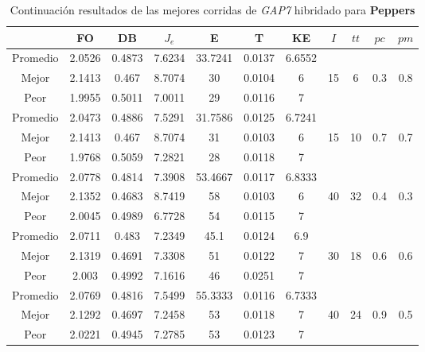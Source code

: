 \begin{table}[h!]
    \footnotesize
    \begin{center}
        \begin{tabular}{|c|c|c|c|c|c|c|c|c|c|c|}
        \hline
             & {\bf FO} & {\bf DB} & $J_e$ & {\bf E} & {\bf T} & {\bf KE} & $I$ & $tt$ & $pc$ & $pm$ \\
        \hline
        \hline
            Promedio  & 2.0526 & 0.4873 & 7.6234 & 33.7241 & 0.0137 & 6.6552 &  &  &  & \\
            \cline{1-7}
            Mejor & 2.1413 & 0.467  & 8.7074 & 30 & 0.0104 & 6 & 15 & 6 & 0.3 & 0.8\\
            \cline{1-7}
            Peor & 1.9955 & 0.5011  & 7.0011 & 29 & 0.0116 & 7 &  &  &  & \\
        \hline
        \hline
            Promedio  & 2.0473 & 0.4886 & 7.5291 & 31.7586 & 0.0125 & 6.7241 &  &  &  & \\
            \cline{1-7}
            Mejor & 2.1413 & 0.467  & 8.7074 & 31 & 0.0103 & 6 & 15 & 10 & 0.7 & 0.7\\
            \cline{1-7}
            Peor & 1.9768 & 0.5059  & 7.2821 & 28 & 0.0118 & 7 &  &  &  & \\
        \hline
        \hline
            Promedio  & 2.0778 & 0.4814 & 7.3908 & 53.4667 & 0.0117 & 6.8333 &  &  &  & \\
            \cline{1-7}
            Mejor & 2.1352 & 0.4683  & 8.7419 & 58 & 0.0103 & 6 & 40 & 32 & 0.4 & 0.3\\
            \cline{1-7}
            Peor & 2.0045 & 0.4989  & 6.7728 & 54 & 0.0115 & 7 &  &  &  & \\
        \hline
        \hline
            Promedio  & 2.0711 & 0.483 & 7.2349 & 45.1 & 0.0124 & 6.9 &  &  &  & \\
            \cline{1-7}
            Mejor & 2.1319 & 0.4691  & 7.3308 & 51 & 0.0122 & 7 & 30 & 18 & 0.6 & 0.6\\
            \cline{1-7}
            Peor & 2.003 & 0.4992  & 7.1616 & 46 & 0.0251 & 7 &  &  &  & \\
        \hline
        \hline
            Promedio  & 2.0769 & 0.4816 & 7.5499 & 55.3333 & 0.0116 & 6.7333 &  &  &  & \\
            \cline{1-7}
            Mejor & 2.1292 & 0.4697  & 7.2458 & 53 & 0.0118 & 7 & 40 & 24 & 0.9 & 0.5\\
            \cline{1-7}
            Peor & 2.0221 & 0.4945  & 7.2785 & 53 & 0.0123 & 7 &  &  &  & \\
        \hline
        \end{tabular}
        \caption{Continuaci\'on resultados de las mejores corridas de \emph{GAP7} hibridado para {\bf Peppers}}
        \label{tb:tablecGAP7}
    \end{center}
\end{table}
